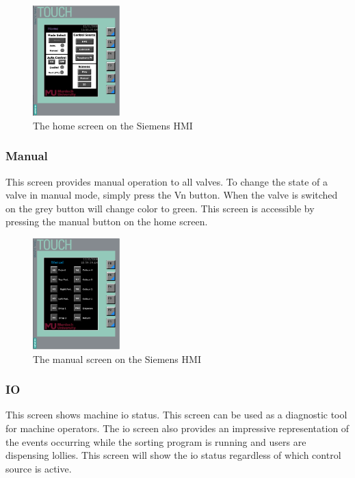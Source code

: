         \begin{figure}[H]
            \centering
            \includegraphics[width = 0.3\textwidth]{2_images/hmiHome.png}
            \caption{The home screen on the Siemens HMI}
            \label{fig:hmiHome}
        \end{figure} 
        
        \subsubsection{Manual}
            This screen provides manual operation to all valves. To change the state of a valve in manual mode, simply press the Vn button. When the valve is switched on the grey button will change color to green. This screen is accessible by pressing the manual button on the home screen. 

        \begin{figure}[H]
            \centering
            \includegraphics[width = 0.3\textwidth]{2_images/hmiManual}
            \caption{The manual screen on the Siemens HMI}
            \label{fig:hmiManual}
        \end{figure} 

        \subsubsection{IO}
            This screen shows machine \acrshort{io} status. This screen can be used as a diagnostic tool for machine operators. The \acrshort{io} screen also provides an impressive representation of the events occurring while the sorting program is running and users are dispensing lollies. This screen will show the \acrshort{io} status regardless of which control source is active.   

